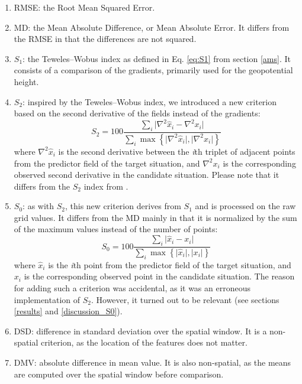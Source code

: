 \documentclass[draft]{agujournal2019}
\begin{document}
\begin{enumerate}
	\item RMSE: the Root Mean Squared Error.
	\item MD: the Mean Absolute Difference, or Mean Absolute Error. It differs from the RMSE in that the differences are not squared.
	\item $S_{1}$: the Teweles--Wobus index as defined in Eq. \ref{eq:S1} from section \ref{ams}. It consists of a comparison of the gradients, primarily used for the geopotential height.
	\item $S_{2}$: inspired by the Teweles--Wobus index, we introduced a new criterion based on the second derivative of the fields instead of the gradients:
	\begin{equation}
		\label{eq:S2}
		S_{2}=100 \frac {\displaystyle 
            \sum_{i} \vert \nabla^{2}\hat{x}_{i} - 
            \nabla^{2} x_{i} \vert
        }
		{\displaystyle 
            \sum_{i} \max\left\lbrace 
                \vert \nabla^{2}\hat{x}_{i} \vert , 
                \vert \nabla^{2} x_{i} \vert 
            \right\rbrace 
        }
	\end{equation}
	where $\nabla^{2} \hat{x}_{i}$ is the second derivative between the \textit{i}th triplet of adjacent points from the predictor field of the target situation, and $\nabla^{2} x_{i}$ is the corresponding observed second derivative in the candidate situation.
 Please note that it differs from the $S_{2}$ index from .
	\item $S_{0}$: as with $S_{2}$, this new criterion derives from $S_{1}$ and is processed on the raw grid values. It differs from the MD mainly in that it is normalized by the sum of the maximum values instead of the number of points:
	\begin{equation}
		\label{eq:S0}
		S_{0}=100 \frac {\displaystyle 
            \sum_{i} \vert \hat{x}_{i} - 
            x_{i} \vert
        }
		{\displaystyle 
            \sum_{i} \max\left\lbrace 
                \vert \hat{x}_{i} \vert , 
                \vert x_{i} \vert 
            \right\rbrace 
        }
	\end{equation}
	where $\hat{x}_{i}$ is the \textit{i}th point from the predictor field of the target situation, and $x_{i}$ is the corresponding observed point in the candidate situation. The reason for adding such a criterion was accidental, as it was an erroneous implementation of $S_{2}$. However, it turned out to be relevant (see sections \ref{results} and \ref{discussion_S0}).
	\item DSD: difference in standard deviation over the spatial window. It is a non-spatial criterion, as the location of the features does not matter.
	\item DMV: absolute difference in mean value. It is also non-spatial, as the means are computed over the spatial window before comparison.
\end{enumerate}
\end{document}
